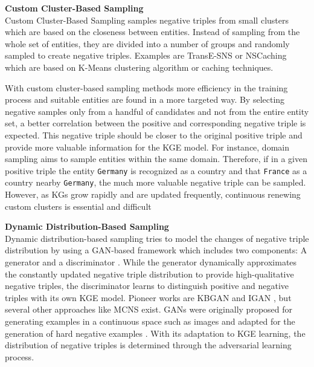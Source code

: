 \textbf{Custom Cluster-Based Sampling} \label{subsubsec:custom_cluster_based_sampling}\\
Custom Cluster-Based Sampling samples negative triples from small clusters which are based on the closeness between entities.
Instead of sampling from the whole set of entities, they are divided into a number of groups and randomly sampled to create negative triples. 
Examples are TransE-\ac{SNS} \cite{TransE-SNS} or \ac{NSCaching} \cite{zhang2019nscaching} which are based on K-Means clustering algorithm or caching techniques. 


With custom cluster-based sampling methods more efficiency in the training process and suitable entities are found in a more targeted way.
By selecting negative samples only from a handful of candidates and not from the entire entity set, a better correlation between the positive and corresponding negative triple is expected.
This negative triple should be closer to the original positive triple and provide more valuable information for the \ac{KGE} model.
For instance, domain sampling \cite{domainSampling} aims to sample entities within the same domain.
Therefore, if in a given positive triple  the entity \texttt{Germany} is recognized as a country and that \texttt{France} as a country nearby \texttt{Germany}, the much more valuable negative triple  can be sampled.
However, as \acp{KG} grow rapidly and are updated frequently, continuous renewing custom clusters is essential and difficult \cite{qianunderstanding}


\textbf{Dynamic Distribution-Based Sampling} \label{subsubsec:dynamic_distribution_based_sampling}\\
%
Dynamic distribution-based sampling tries to model the changes of negative triple distribution by using a \ac{GAN}-based framework which includes two components: 
A generator and a discriminator \cite{zhang2021efficient}.
While the generator dynamically approximates the constantly updated negative triple distribution to provide high-qualitative negative triples,
the discriminator learns to distinguish positive and negative triples with its own \ac{KGE} model.
Pioneer works are \ac{KBGAN} \cite{cai2017kbgan} and \ac{IGAN} \cite{IGAN}, but several other approaches like \ac{MCNS} \cite{MCNS} exist.
\acp{GAN} were originally proposed for generating examples in a continuous space such as images and adapted for the generation of hard negative examples \cite{zhang2021efficient}.
With its adaptation to \ac{KGE} learning, the distribution of negative triples is determined through the adversarial learning process.  

